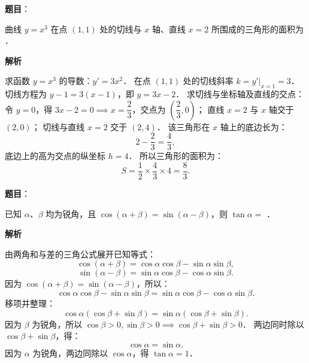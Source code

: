 \begin{answer}

\textbf{题目}：

曲线 $y = x^3$ 在点 $(1, 1)$ 处的切线与 $x$ 轴、直线 $x = 2$ 所围成的三角形的面积为 \underline{\hspace{2cm}}．

\textbf{解析}

求函数 $y = x^3$ 的导数：$y' = 3x^2$．
在点 $(1, 1)$ 处的切线斜率 $k = y'|_{x=1} = 3$．
切线方程为 $y - 1 = 3(x - 1)$，即 $y = 3x - 2$．
求切线与坐标轴及直线的交点：
令 $y = 0$，得 $3x - 2 = 0 \implies x = \dfrac{2}{3}$，交点为 $\left(\dfrac{2}{3}, 0\right)$；
直线 $x = 2$ 与 $x$ 轴交于 $(2, 0)$；
切线与直线 $x = 2$ 交于 $(2, 4)$．
该三角形在 $x$ 轴上的底边长为：
\nopagebreak[4]
\[
2 - \frac{2}{3} = \frac{4}{3},
\]
底边上的高为交点的纵坐标 $h = 4$．
所以三角形的面积为：
\nopagebreak[4]
\[
S = \frac{1}{2} \times \frac{4}{3} \times 4 = \frac{8}{3}.
\]


\end{answer}
\begin{answer}

\textbf{题目}：

已知 $\alpha$、$\beta$ 均为锐角，且 $\cos(\alpha + \beta) = \sin(\alpha - \beta)$，则 $\tan\alpha =$ \underline{\hspace{2cm}}．

\textbf{解析}

由两角和与差的三角公式展开已知等式：
\nopagebreak[4]
\[
\cos(\alpha + \beta) = \cos\alpha\cos\beta - \sin\alpha\sin\beta,
\]
\nopagebreak[4]
\[
\sin(\alpha - \beta) = \sin\alpha\cos\beta - \cos\alpha\sin\beta.
\]
因为 $\cos(\alpha + \beta) = \sin(\alpha - \beta)$，所以：
\nopagebreak[4]
\[
\cos\alpha\cos\beta - \sin\alpha\sin\beta = \sin\alpha\cos\beta - \cos\alpha\sin\beta.
\]
移项并整理：
\nopagebreak[4]
\[
\cos\alpha(\cos\beta + \sin\beta) = \sin\alpha(\cos\beta + \sin\beta).
\]
因为 $\beta$ 为锐角，所以 $\cos\beta > 0, \sin\beta > 0 \implies \cos\beta + \sin\beta > 0$．
两边同时除以 $\cos\beta + \sin\beta$，得：
\nopagebreak[4]
\[
\cos\alpha = \sin\alpha.
\]
因为 $\alpha$ 为锐角，两边同除以 $\cos\alpha$，得 $\tan\alpha = 1$．


\end{answer}
